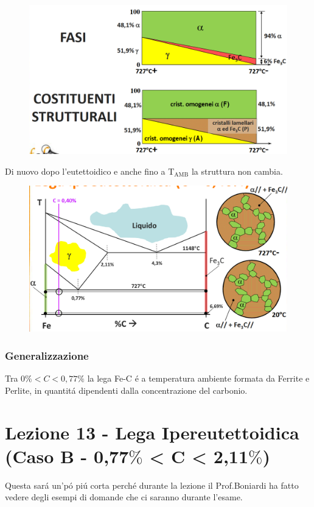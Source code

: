 \documentclass{article}
\begin{document}
{\begin{figure}[h!]
            \end{figure}
            \begin{figure}[h!]
                \centering
                \includegraphics[width=.8\linewidth]{L12 - Diagramma Fe-C - 0,40C - Fasi e Costituenti all'eutettoidico.png}
            \end{figure}
            Di nuovo dopo l'eutettoidico e anche fino a T$_\text{AMB}$ la struttura non cambia.
            \begin{figure}[h!]
                \centering
                \includegraphics[width=.8\linewidth]{L12 - Diagramma Fe-C - 0,40C - Cambio di Struttura 4.png}
            \end{figure}
            \subsubsection{Generalizzazione}
                Tra $0\%<C<0,77\%$ la lega Fe-C \'e a temperatura ambiente formata da Ferrite e Perlite, in quantit\'a dipendenti dalla concentrazione del carbonio.
    \section{Lezione 13 - Lega Ipereutettoidica (Caso B - 0,77$\%$ < C < 2,11$\%$)}
        Questa sar\'a un'p\'o pi\'u corta perch\'e durante la lezione il Prof.Boniardi ha fatto vedere degli esempi di domande che ci saranno durante l'esame.
}
\end{document}
